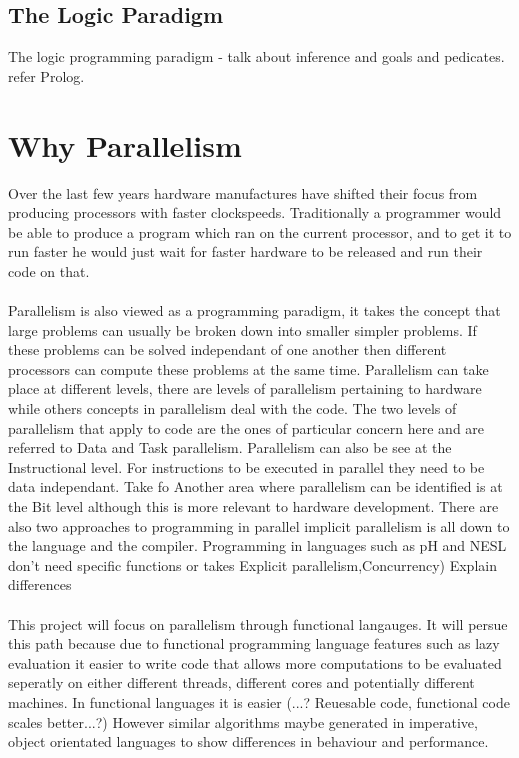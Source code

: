 \documentclass{report}
\begin{document}
\subsection{The Logic Paradigm}
The logic programming paradigm - talk about inference and goals and pedicates. refer Prolog.

\section{Why Parallelism}
Over the last few years hardware manufactures have shifted their focus from producing processors with faster clockspeeds. Traditionally a programmer would be able to produce a program which ran on the current processor, and to get it to run faster he would just wait for faster hardware to be released and run their code on that.  

\paragraph{}
Parallelism is also viewed as a programming paradigm, it takes the concept that large problems can usually be broken down into smaller simpler problems. If these problems can be solved independant of one another then different processors can compute these problems at the same time. Parallelism can take place at different levels, there are levels of parallelism pertaining to hardware while others concepts in parallelism deal with the code. The two levels of parallelism that apply to code are the ones of particular concern here and are referred to Data and Task parallelism. Parallelism can also be see at the Instructional level. For instructions to be executed in parallel they need to be data independant. Take fo  Another area where parallelism can be identified is at the Bit level although this is more relevant to hardware development. There are also two approaches to programming in parallel implicit parallelism is all down to the language and the compiler. Programming in languages such as pH and NESL don't need specific functions or  takes Explicit parallelism,Concurrency) Explain differences

\paragraph{}
This project will focus on parallelism through functional langauges. It will persue this path because due to functional programming language features such as lazy evaluation it easier to write code that allows more computations to be evaluated seperatly on either different threads, different cores and potentially different machines. In functional languages it is easier (...? Reuesable code, functional code scales better...?) However similar algorithms maybe generated in imperative, object orientated languages to show differences in behaviour and performance. 
\end{document}
